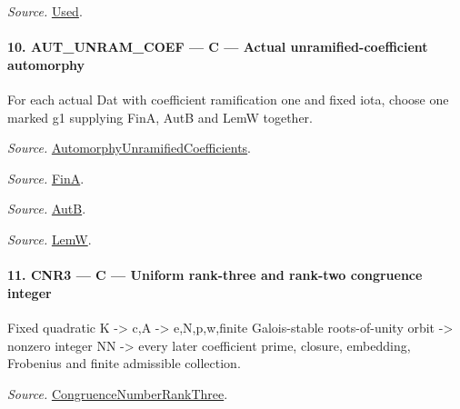 \emph{Source.} \href{https://github.com/CocoSgt/riemann-hypothesis-lean/blob/7cbf7a0c32fca1badf05931879a37c3f8a2b03b4/src/Development/AutomorphicArithmetic/AutomorphicVarieties/ModularityArgument/KatoQuadraticCharacters/KatoTwoOfUseN.lean#L11-L41}{Used}.



\paragraph{10. AUT\_\allowbreak UNRAM\_\allowbreak COEF — C — Actual unramified-coefficient automorphy}

For each actual Dat with coefficient ramification one and fixed iota, choose one marked g1 supplying FinA, AutB and LemW together.

\emph{Source.} \href{https://github.com/CocoSgt/riemann-hypothesis-lean/blob/7cbf7a0c32fca1badf05931879a37c3f8a2b03b4/src/Development/AutomorphicArithmetic/AutomorphicVarieties/AutomorphicCases/AutomorphyUnramifiedCoefficients.lean#L24-L27}{AutomorphyUnramifiedCoefficients}.

\emph{Source.} \href{https://github.com/CocoSgt/riemann-hypothesis-lean/blob/7cbf7a0c32fca1badf05931879a37c3f8a2b03b4/src/Development/AutomorphicArithmetic/AutomorphicVarieties/AutomorphicCases/AutomorphyUnramifiedCoefficients.lean#L12-L13}{FinA}.

\emph{Source.} \href{https://github.com/CocoSgt/riemann-hypothesis-lean/blob/7cbf7a0c32fca1badf05931879a37c3f8a2b03b4/src/Development/AutomorphicArithmetic/AutomorphicVarieties/AutomorphicCases/AutomorphyUnramifiedCoefficients.lean#L15-L17}{AutB}.

\emph{Source.} \href{https://github.com/CocoSgt/riemann-hypothesis-lean/blob/7cbf7a0c32fca1badf05931879a37c3f8a2b03b4/src/Development/AutomorphicArithmetic/AutomorphicVarieties/AutomorphicCases/AutomorphyUnramifiedCoefficients.lean#L19-L22}{LemW}.



\paragraph{11. CNR3 — C — Uniform rank-three and rank-two congruence integer}

Fixed quadratic K -> c,A -> e,N,p,w,finite Galois-stable roots-of-unity orbit -> nonzero integer NN -> every later coefficient prime, closure, embedding, Frobenius and finite admissible collection.

\emph{Source.} \href{https://github.com/CocoSgt/riemann-hypothesis-lean/blob/7cbf7a0c32fca1badf05931879a37c3f8a2b03b4/src/Development/AutomorphicArithmetic/AutomorphicVarieties/AutomorphicForms/CongruenceNumberRankThree.lean#L125-L140}{CongruenceNumberRankThree}.



